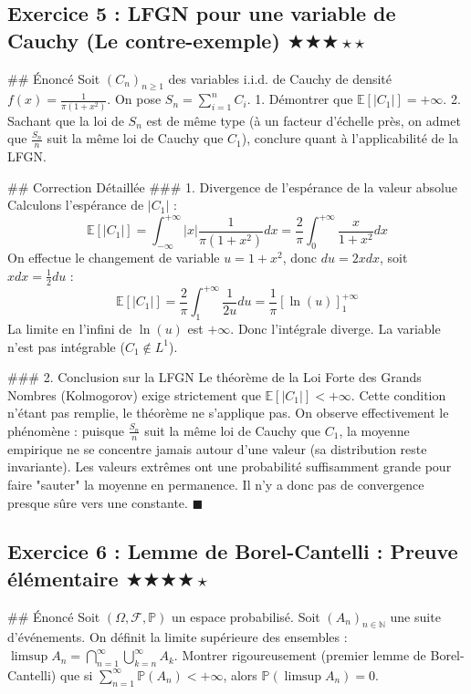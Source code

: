 \documentclass[11pt,a4paper]{article}
\begin{document}
\subsection*{Exercice 5 : LFGN pour une variable de Cauchy (Le contre-exemple) \quad $\bigstar\bigstar\bigstar\star\star$}

\#\# Énoncé
Soit $(C_n)_{n \ge 1}$ des variables i.i.d. de Cauchy de densité $f(x) = \frac{1}{\pi(1+x^2)}$.
On pose $S_n = \sum_{i=1}^n C_i$.
1. Démontrer que $\mathbb{E}[|C_1|] = +\infty$.
2. Sachant que la loi de $S_n$ est de même type (à un facteur d'échelle près, on admet que $\frac{S_n}{n}$ suit la même loi de Cauchy que $C_1$), conclure quant à l'applicabilité de la LFGN.

\#\# Correction Détaillée
\#\#\# 1. Divergence de l'espérance de la valeur absolue
Calculons l'espérance de $|C_1|$ :
$$ \mathbb{E}[|C_1|] = \int_{-\infty}^{+\infty} |x| \frac{1}{\pi(1+x^2)} dx = \frac{2}{\pi} \int_0^{+\infty} \frac{x}{1+x^2} dx $$
On effectue le changement de variable $u = 1+x^2$, donc $du = 2x dx$, soit $x dx = \frac{1}{2} du$ :
$$ \mathbb{E}[|C_1|] = \frac{2}{\pi} \int_1^{+\infty} \frac{1}{2u} du = \frac{1}{\pi} [\ln(u)]_1^{+\infty} $$
La limite en l'infini de $\ln(u)$ est $+\infty$. Donc l'intégrale diverge. La variable n'est pas intégrable ($C_1 \notin L^1$).

\#\#\# 2. Conclusion sur la LFGN
Le théorème de la Loi Forte des Grands Nombres (Kolmogorov) exige strictement que $\mathbb{E}[|C_1|] < +\infty$. Cette condition n'étant pas remplie, le théorème ne s'applique pas.
On observe effectivement le phénomène : puisque $\frac{S_n}{n}$ suit la même loi de Cauchy que $C_1$, la moyenne empirique ne se concentre jamais autour d'une valeur (sa distribution reste invariante). Les valeurs extrêmes ont une probabilité suffisamment grande pour faire "sauter" la moyenne en permanence. Il n'y a donc pas de convergence presque sûre vers une constante. $\blacksquare$


\subsection*{Exercice 6 : Lemme de Borel-Cantelli : Preuve élémentaire \quad $\bigstar\bigstar\bigstar\bigstar\star$}

\#\# Énoncé
Soit $(\Omega, \mathcal{F}, \mathbb{P})$ un espace probabilisé. Soit $(A_n)_{n \in \mathbb{N}}$ une suite d'événements.
On définit la limite supérieure des ensembles : $\limsup A_n = \bigcap_{n=1}^\infty \bigcup_{k=n}^\infty A_k$.
Montrer rigoureusement (premier lemme de Borel-Cantelli) que si $\sum_{n=1}^\infty \mathbb{P}(A_n) < +\infty$, alors $\mathbb{P}(\limsup A_n) = 0$.
\end{document}
